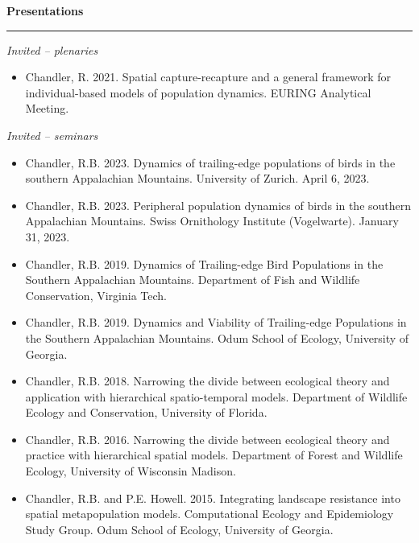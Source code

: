 \documentclass[12pt]{article}
\begin{document}
\vspace{0.5cm}


{\large \bf Presentations} \\
\rule[3mm]{\textwidth}{0.3mm}

\emph{Invited -- plenaries}

\begin{itemize}

\item Chandler, R. 2021. Spatial capture-recapture and a general
  framework for individual-based models of population dynamics.
  EURING Analytical Meeting. 

\end{itemize}  

\emph{Invited -- seminars}

\begin{itemize}

\item Chandler, R.B. 2023. Dynamics of trailing-edge populations of
  birds in the southern Appalachian Mountains. University of
  Zurich. April 6, 2023.

\item Chandler, R.B. 2023. Peripheral population dynamics of birds in
  the southern Appalachian Mountains. Swiss Ornithology Institute
  (Vogelwarte). January 31, 2023.
  
\item Chandler, R.B. 2019. Dynamics of Trailing-edge Bird Populations
  in the Southern Appalachian Mountains. Department of Fish and
  Wildlife Conservation, Virginia Tech.

\item Chandler, R.B. 2019. Dynamics and Viability of Trailing-edge
  Populations in the Southern Appalachian Mountains. Odum School of
  Ecology, University of Georgia.

\item Chandler, R.B. 2018. Narrowing the divide between ecological
  theory and application with hierarchical spatio-temporal
  models. Department of Wildlife Ecology and Conservation, 
  University of Florida.

\item Chandler, R.B. 2016. Narrowing the divide between ecological
  theory and practice with hierarchical spatial models. Department of
  Forest and Wildlife Ecology, University of Wisconsin Madison. 

\item Chandler, R.B. and P.E. Howell. 2015. Integrating landscape
  resistance into spatial metapopulation models. Computational Ecology
  and Epidemiology Study Group. Odum School of Ecology, University of
  Georgia. 


\end{itemize}
\end{document}
